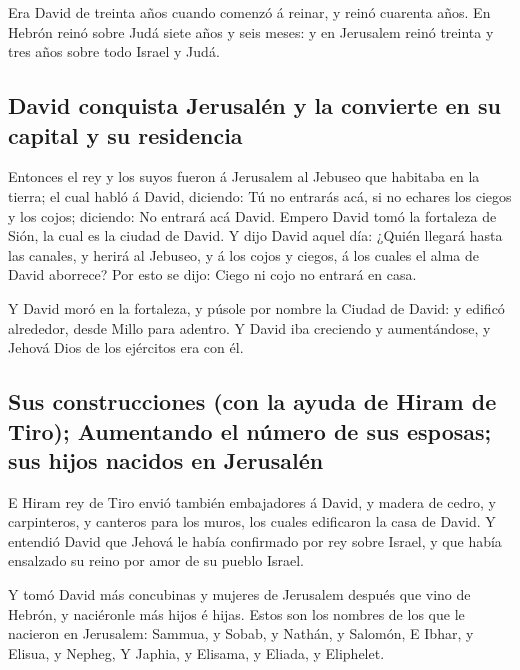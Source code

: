  Era David de treinta años cuando comenzó á reinar, y
reinó cuarenta años.  En Hebrón reinó sobre Judá siete
años y seis meses: y en Jerusalem reinó treinta y tres años sobre todo
Israel y Judá.

\hypertarget{david-conquista-jerusaluxe9n-y-la-convierte-en-su-capital-y-su-residencia}{%
\subsection{David conquista Jerusalén y la convierte en su capital y su
residencia}\label{david-conquista-jerusaluxe9n-y-la-convierte-en-su-capital-y-su-residencia}}

 Entonces el rey y los suyos fueron á Jerusalem al Jebuseo
que habitaba en la tierra; el cual habló á David, diciendo: Tú no
entrarás acá, si no echares los ciegos y los cojos; diciendo: No entrará
acá David.  Empero David tomó la fortaleza de Sión, la
cual es la ciudad de David.  Y dijo David aquel día:
¿Quién llegará hasta las canales, y herirá al Jebuseo, y á los cojos y
ciegos, á los cuales el alma de David aborrece? Por esto se dijo: Ciego
ni cojo no entrará en casa.

 Y David moró en la fortaleza, y púsole por nombre la
Ciudad de David: y edificó alrededor, desde Millo para adentro.
 Y David iba creciendo y aumentándose, y Jehová Dios de
los ejércitos era con él.

\hypertarget{sus-construcciones-con-la-ayuda-de-hiram-de-tiro-aumentando-el-nuxfamero-de-sus-esposas-sus-hijos-nacidos-en-jerusaluxe9n}{%
\subsection{Sus construcciones (con la ayuda de Hiram de Tiro);
Aumentando el número de sus esposas; sus hijos nacidos en
Jerusalén}\label{sus-construcciones-con-la-ayuda-de-hiram-de-tiro-aumentando-el-nuxfamero-de-sus-esposas-sus-hijos-nacidos-en-jerusaluxe9n}}

 E Hiram rey de Tiro envió también embajadores á David, y
madera de cedro, y carpinteros, y canteros para los muros, los cuales
edificaron la casa de David.  Y entendió David que Jehová
le había confirmado por rey sobre Israel, y que había ensalzado su reino
por amor de su pueblo Israel.

 Y tomó David más concubinas y mujeres de Jerusalem
después que vino de Hebrón, y naciéronle más hijos é hijas.
 Estos son los nombres de los que le nacieron en
Jerusalem: Sammua, y Sobab, y Nathán, y Salomón,  E
Ibhar, y Elisua, y Nepheg,  Y Japhia, y Elisama, y
Eliada, y Eliphelet.

